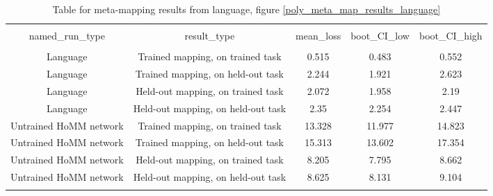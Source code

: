 \begin{table}[H]
\scriptsize
\centering
\begin{tabular}{@{\extracolsep{5pt}} ccccc} 
\\[-1.8ex]\hline 
\hline \\[-1.8ex] 
named\_run\_type & result\_type & mean\_loss & boot\_CI\_low & boot\_CI\_high \\ 
\hline \\[-1.8ex] 
Language & Trained mapping, on trained task & 0.515 & 0.483 & 0.552 \\ 
Language & Trained mapping, on held-out task & 2.244 & 1.921 & 2.623 \\ 
Language & Held-out mapping, on trained task & 2.072 & 1.958 & 2.19 \\ 
Language & Held-out mapping, on held-out task & 2.35 & 2.254 & 2.447 \\ 
Untrained HoMM network & Trained mapping, on trained task & 13.328 & 11.977 & 14.823 \\ 
Untrained HoMM network & Trained mapping, on held-out task & 15.313 & 13.602 & 17.354 \\ 
Untrained HoMM network & Held-out mapping, on trained task & 8.205 & 7.795 & 8.662 \\ 
Untrained HoMM network & Held-out mapping, on held-out task & 8.625 & 8.131 & 9.104 \\ 
\hline \\[-1.8ex] 
\end{tabular}
\caption{Table for meta-mapping results from language, figure \ref{poly_meta_map_results_language}}
\end{table}

